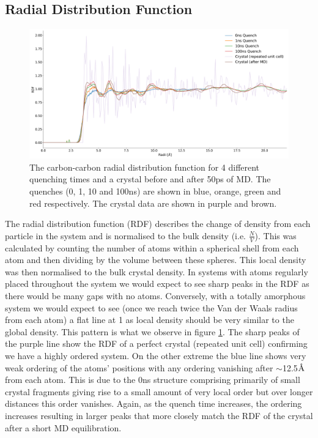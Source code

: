 \subsection{Radial Distribution Function}
\begin{figure}[H]
	\centering
	\includegraphics[width=\textwidth]{./img/DifferentQuenchTimes/RDF.png}
	\caption{\label{fig:RDF}The carbon-carbon radial distribution function for 4 different quenching times and a crystal before and after 50ps of MD. The quenches (0, 1, 10 and 100ns) are shown in blue, orange, green and red respectively. The crystal data are shown in purple and brown.}
\end{figure}
\noindent The radial distribution function (RDF) describes the change of density from each particle in the system and is normalised to the bulk density (i.e. $\frac{N}{V}$). This was calculated by counting the number of atoms within a spherical shell from each atom and then dividing by the volume between these spheres. This local density was then normalised to the bulk crystal density. In systems with atoms regularly placed throughout the system we would expect to see sharp peaks in the RDF as there would be many gaps with no atoms. Conversely, with a totally amorphous system we would expect to see (once we reach twice the Van der Waals radius from each atom) a flat line at 1 as local density should be very similar to the global density. This pattern is what we observe in figure \ref{fig:RDF}. The sharp peaks of the purple line show the RDF of a perfect crystal (repeated unit cell) confirming we have a highly ordered system. On the other extreme the blue line shows very weak ordering of the atoms' positions with any ordering vanishing after $\sim$12.5$\text{\normalfont\AA}$ from each atom. This is due to the 0ns structure comprising primarily of small crystal fragments giving rise to a small amount of very local order but over longer distances this order vanishes. Again, as the quench time increases, the ordering increases resulting in larger peaks that more closely match the RDF of the crystal after a short MD equilibration.

